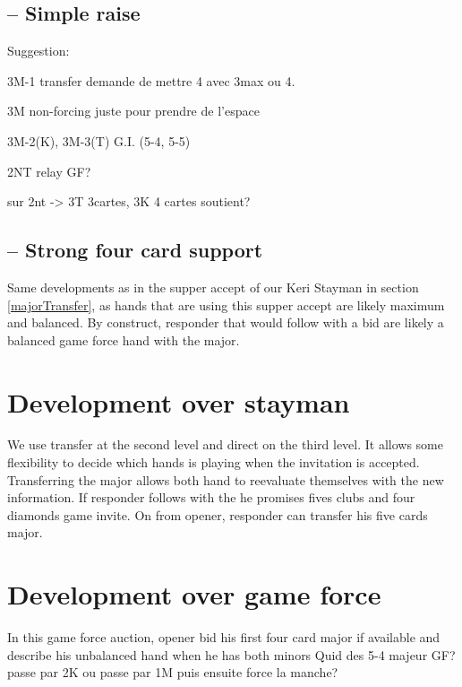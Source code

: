 \subsection{ – Simple raise}
{
  \color{red}
  Suggestion: 
  
  3M-1 transfer demande de mettre 4 avec 3max ou 4.

  3M non-forcing juste pour prendre de l'espace
  
  3M-2(K), 3M-3(T) G.I. (5-4, 5-5)
  
  2NT relay GF?
  
  sur 2nt -> 3T 3cartes, 3K 4 cartes soutient?
}
\subsection{\bid{2\NT} – Strong four card support}
Same developments as in the supper accept of our Keri Stayman in section \ref{majorTransfer}, as hands that are using this supper accept are likely maximum and balanced. By construct, responder that would follow with a \bid{3\CS} bid are likely a balanced game force hand with the major.
\section{Development over \bid{2\CS} stayman}
We use transfer at the second level and direct on the third level. It allows some flexibility to decide which hands is playing when the invitation is accepted.
Transferring the major allows both hand to reevaluate themselves with the new information. If responder follows with the \bid{3\CS} he promises fives clubs and four diamonds game invite. On \bid{2\NT} from opener, {\color{red} responder can transfer his five cards major}.
\section{Development over \bid{2\DS} game force}
In this game force auction, opener bid his first four card major if available and describe his unbalanced hand when he has both minors
{\color{red} Quid des 5-4 majeur GF? passe par 2K ou passe par 1M puis ensuite force la manche?}
